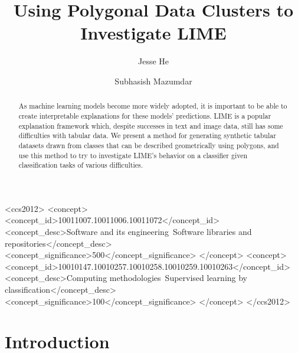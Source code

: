 \documentclass[manuscript,screen,review]{acmart}
\begin{document}
\title{Using Polygonal Data Clusters to Investigate LIME}

\author{Jesse He}
\author{Subhasish Mazumdar}

\begin{abstract}
    As machine learning models become more widely adopted, it is important to be able to create interpretable
    explanations for these models' predictions. LIME is a popular explanation framework which, despite successes
    in text and image data, still has some difficulties with tabular data. We present a method for generating
    synthetic tabular datasets drawn from classes that can be described geometrically using polygons, and use this 
    method to try to investigate LIME's behavior on a classifier given classification tasks of various difficulties.
\end{abstract}

\begin{CCSXML}
<ccs2012>
   <concept>
       <concept_id>10011007.10011006.10011072</concept_id>
       <concept_desc>Software and its engineering~Software libraries and repositories</concept_desc>
       <concept_significance>500</concept_significance>
       </concept>
   <concept>
       <concept_id>10010147.10010257.10010258.10010259.10010263</concept_id>
       <concept_desc>Computing methodologies~Supervised learning by classification</concept_desc>
       <concept_significance>100</concept_significance>
       </concept>
 </ccs2012>
\end{CCSXML}



\maketitle

\section{Introduction}
\end{document}
